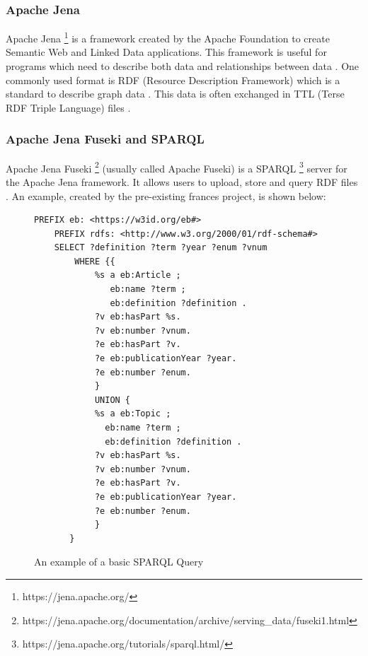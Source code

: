 \documentclass[12pt, letterpaper]{article}
\begin{document}
\subsubsection{Apache Jena}\label{sec:jena-desc}

Apache Jena
\footnote{https://jena.apache.org/}
is a framework created by the Apache Foundation to create Semantic Web and Linked Data applications. This framework is useful for programs which need to describe both data and relationships between data  \cite{apache-jena}. One commonly used format is RDF (Resource Description Framework) which is a standard to describe graph data \cite{apache-jena}. This data is often exchanged in TTL (Terse RDF Triple Language) files \cite{ttl-files}.

\subsubsection{Apache Jena Fuseki and SPARQL}\label{sec:sparql-desc}\label{sec:fuseki-desc}

Apache Jena Fuseki
\footnote{https://jena.apache.org/documentation/archive/serving\_data/fuseki1.html}
(usually called Apache Fuseki) is a SPARQL
\footnote{https://jena.apache.org/tutorials/sparql.html/}
server for the Apache Jena framework. It allows users to upload, store and query RDF files \cite{apache-fuseki}. An example, created by the pre-existing frances project, is shown below:

\begin{flushleft}
\begin{figure}[H]
\begin{verbatim}
PREFIX eb: <https://w3id.org/eb#>
    PREFIX rdfs: <http://www.w3.org/2000/01/rdf-schema#>
    SELECT ?definition ?term ?year ?enum ?vnum
        WHERE {{
            %s a eb:Article ;
               eb:name ?term ;
               eb:definition ?definition . 
            ?v eb:hasPart %s.
            ?v eb:number ?vnum.
            ?e eb:hasPart ?v.
            ?e eb:publicationYear ?year.
            ?e eb:number ?enum.
            }
            UNION {
            %s a eb:Topic ;
              eb:name ?term ; 
              eb:definition ?definition . 
            ?v eb:hasPart %s.
            ?v eb:number ?vnum.
            ?e eb:hasPart ?v.
            ?e eb:publicationYear ?year.
            ?e eb:number ?enum.
            }
       }  
\end{verbatim}
\caption{An example of a basic SPARQL Query \cite{defoe}}
\end{figure}
\end{flushleft}
\end{document}
